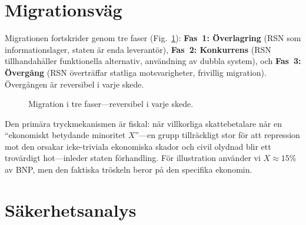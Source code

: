 \documentclass[11pt,a4paper,twocolumn]{article}
\begin{document}
\section{Migrationsväg}

Migrationen fortskrider genom tre faser (Fig.~\ref{fig:migration}): \textbf{Fas~1: Överlagring} (RSN som informationslager, staten är enda leverantör), \textbf{Fas~2: Konkurrens} (RSN tillhandahåller funktionella alternativ, användning av dubbla system), och \textbf{Fas~3: Övergång} (RSN överträffar statliga motsvarigheter, frivillig migration). Övergången är reversibel i varje skede.

\begin{figure}[ht]
\centering
{}
\caption{Migration i tre faser---reversibel i varje skede.}
\label{fig:migration}
\end{figure}

Den primära tryckmekanismen är fiskal: när villkorliga skattebetalare når en ``ekonomiskt betydande minoritet $X$''---en grupp tillräckligt stor för att repression mot den orsakar icke-triviala ekonomiska skador och civil olydnad blir ett trovärdigt hot---inleder staten förhandling. För illustration använder vi $X \approx 15\%$ av BNP, men den faktiska tröskeln beror på den specifika ekonomin.

\section{Säkerhetsanalys}
\end{document}
